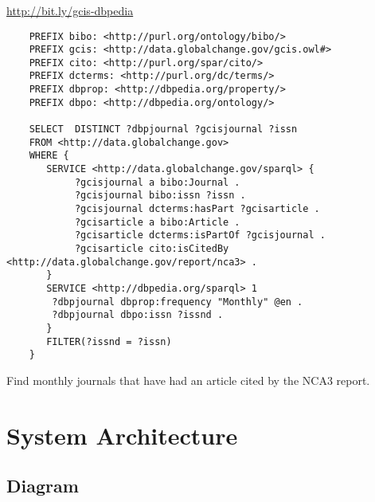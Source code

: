 \documentclass{beamer}
\begin{document}
\begin{frame}[fragile]
    \frametitle{\insertsubsectionhead}
     \url{http://bit.ly/gcis-dbpedia}\\
\begin{tiny}
\begin{Verbatim}
    PREFIX bibo: <http://purl.org/ontology/bibo/>
    PREFIX gcis: <http://data.globalchange.gov/gcis.owl#>
    PREFIX cito: <http://purl.org/spar/cito/>
    PREFIX dcterms: <http://purl.org/dc/terms/>
    PREFIX dbprop: <http://dbpedia.org/property/>
    PREFIX dbpo: <http://dbpedia.org/ontology/>

    SELECT  DISTINCT ?dbpjournal ?gcisjournal ?issn
    FROM <http://data.globalchange.gov>
    WHERE {
       SERVICE <http://data.globalchange.gov/sparql> {
            ?gcisjournal a bibo:Journal .
            ?gcisjournal bibo:issn ?issn .
            ?gcisjournal dcterms:hasPart ?gcisarticle .
            ?gcisarticle a bibo:Article .
            ?gcisarticle dcterms:isPartOf ?gcisjournal .
            ?gcisarticle cito:isCitedBy <http://data.globalchange.gov/report/nca3> .
       }
       SERVICE <http://dbpedia.org/sparql> 1
        ?dbpjournal dbprop:frequency "Monthly" @en .
        ?dbpjournal dbpo:issn ?issnd .
       }
       FILTER(?issnd = ?issn)
    }
\end{Verbatim}
\end{tiny}
    Find monthly journals that have had an article cited by the NCA3 report.

\end{frame}

\section{System Architecture}

\subsection{Diagram}

\end{document}
